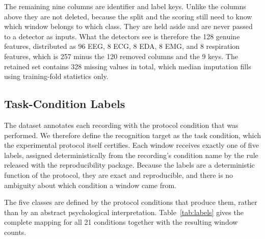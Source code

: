 \documentclass[a4paper,twoside]{article}
\begin{document}
The remaining nine columns are identifier and label keys. Unlike the columns above they are not deleted, because the split and the scoring still need to know which window belongs to which class. They are held aside and are never passed to a detector as inputs. What the detectors see is therefore the 128 genuine features, distributed as 96 \ac{EEG}, 8 \ac{ECG}, 8 \ac{EDA}, 8 \ac{EMG}, and 8 respiration features, which is 257 minus the 120 removed columns and the 9 keys. The retained set contains 328 missing values in total, which median imputation fills using training-fold statistics only.

\subsection{Task-Condition Labels}

\noindent The dataset annotates each recording with the protocol condition that was performed. We therefore define the recognition target as the task condition, which the experimental protocol itself certifies. Each window receives exactly one of five labels, assigned deterministically from the recording's condition name by the rule released with the reproducibility package. Because the labels are a deterministic function of the protocol, they are exact and reproducible, and there is no ambiguity about which condition a window came from.

The five classes are defined by the protocol conditions that produce them, rather than by an abstract psychological interpretation. Table~\ref{tab:labels} gives the complete mapping for all 21 conditions together with the resulting window counts.
\end{document}
